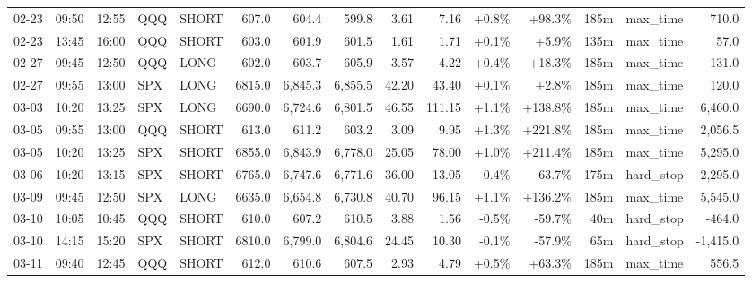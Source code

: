 \documentclass[11pt,a4paper,twoside]{article}
\begin{document}
\begin{landscape}
\begin{center}
\begin{longtable}{>{\color{txtmain}}l l l l l r r r r r r r r >{\color{txtmain}}l r}
02-23 & 09:50 & 12:55 & QQQ & SHORT & 607.0 & 604.4 & 599.8 & 3.61 & 7.16 & \textcolor{wingreen}{+0.8\%} & \textcolor{wingreen}{+98.3\%} & 185m & max\_time & \textcolor{wingreen}{710.0} \\
02-23 & 13:45 & 16:00 & QQQ & SHORT & 603.0 & 601.9 & 601.5 & 1.61 & 1.71 & \textcolor{wingreen}{+0.1\%} & \textcolor{wingreen}{+5.9\%} & 135m & max\_time & \textcolor{wingreen}{57.0} \\
02-27 & 09:45 & 12:50 & QQQ & LONG & 602.0 & 603.7 & 605.9 & 3.57 & 4.22 & \textcolor{wingreen}{+0.4\%} & \textcolor{wingreen}{+18.3\%} & 185m & max\_time & \textcolor{wingreen}{131.0} \\
02-27 & 09:55 & 13:00 & SPX & LONG & 6815.0 & 6,845.3 & 6,855.5 & 42.20 & 43.40 & \textcolor{wingreen}{+0.1\%} & \textcolor{wingreen}{+2.8\%} & 185m & max\_time & \textcolor{wingreen}{120.0} \\
03-03 & 10:20 & 13:25 & SPX & LONG & 6690.0 & 6,724.6 & 6,801.5 & 46.55 & 111.15 & \textcolor{wingreen}{+1.1\%} & \textcolor{wingreen}{+138.8\%} & 185m & max\_time & \textcolor{wingreen}{6,460.0} \\
03-05 & 09:55 & 13:00 & QQQ & SHORT & 613.0 & 611.2 & 603.2 & 3.09 & 9.95 & \textcolor{wingreen}{+1.3\%} & \textcolor{wingreen}{+221.8\%} & 185m & max\_time & \textcolor{wingreen}{2,056.5} \\
03-05 & 10:20 & 13:25 & SPX & SHORT & 6855.0 & 6,843.9 & 6,778.0 & 25.05 & 78.00 & \textcolor{wingreen}{+1.0\%} & \textcolor{wingreen}{+211.4\%} & 185m & max\_time & \textcolor{wingreen}{5,295.0} \\
03-06 & 10:20 & 13:15 & SPX & SHORT & 6765.0 & 6,747.6 & 6,771.6 & 36.00 & 13.05 & \textcolor{lossred}{-0.4\%} & \textcolor{lossred}{-63.7\%} & 175m & hard\_stop & \textcolor{lossred}{-2,295.0} \\
03-09 & 09:45 & 12:50 & SPX & LONG & 6635.0 & 6,654.8 & 6,730.8 & 40.70 & 96.15 & \textcolor{wingreen}{+1.1\%} & \textcolor{wingreen}{+136.2\%} & 185m & max\_time & \textcolor{wingreen}{5,545.0} \\
03-10 & 10:05 & 10:45 & QQQ & SHORT & 610.0 & 607.2 & 610.5 & 3.88 & 1.56 & \textcolor{lossred}{-0.5\%} & \textcolor{lossred}{-59.7\%} & 40m & hard\_stop & \textcolor{lossred}{-464.0} \\
03-10 & 14:15 & 15:20 & SPX & SHORT & 6810.0 & 6,799.0 & 6,804.6 & 24.45 & 10.30 & \textcolor{lossred}{-0.1\%} & \textcolor{lossred}{-57.9\%} & 65m & hard\_stop & \textcolor{lossred}{-1,415.0} \\
03-11 & 09:40 & 12:45 & QQQ & SHORT & 612.0 & 610.6 & 607.5 & 2.93 & 4.79 & \textcolor{wingreen}{+0.5\%} & \textcolor{wingreen}{+63.3\%} & 185m & max\_time & \textcolor{wingreen}{556.5} \\

\end{longtable}
\end{center}
\end{landscape}
\end{document}
